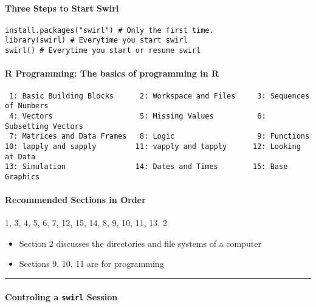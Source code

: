 \documentclass[
]{article}
\providecommand{\tightlist}{%
  \setlength{\itemsep}{0pt}\setlength{\parskip}{0pt}}
\begin{document}
\hypertarget{three-steps-to-start-swirl}{%
\paragraph{Three Steps to Start
Swirl}\label{three-steps-to-start-swirl}}

\begin{verbatim}
install.packages("swirl") # Only the first time.
library(swirl) # Everytime you start swirl
swirl() # Everytime you start or resume swirl
\end{verbatim}

\hypertarget{r-programming-the-basics-of-programming-in-r}{%
\paragraph{R Programming: The basics of programming in
R}\label{r-programming-the-basics-of-programming-in-r}}

\scriptsize

\begin{verbatim}
 1: Basic Building Blocks      2: Workspace and Files     3: Sequences of Numbers    
 4: Vectors                    5: Missing Values          6: Subsetting Vectors      
 7: Matrices and Data Frames   8: Logic                   9: Functions               
10: lapply and sapply         11: vapply and tapply      12: Looking at Data         
13: Simulation                14: Dates and Times        15: Base Graphics          
\end{verbatim}

\hypertarget{recommended-sections-in-order}{%
\paragraph{Recommended Sections in
Order}\label{recommended-sections-in-order}}

1, 3, 4, 5, 6, 7, 12, 15, 14, 8, 9, 10, 11, 13, 2

\begin{itemize}
\tightlist
\item
  Section 2 discusses the directories and file systems of a computer
\item
  Sections 9, 10, 11 are for programming
\end{itemize}

\begin{center}\rule{0.5\linewidth}{0.5pt}\end{center}

\hypertarget{controling-a-swirl-session}{%
\paragraph{\texorpdfstring{Controling a \texttt{swirl}
Session}{Controling a swirl Session}}\label{controling-a-swirl-session}}
\end{document}
